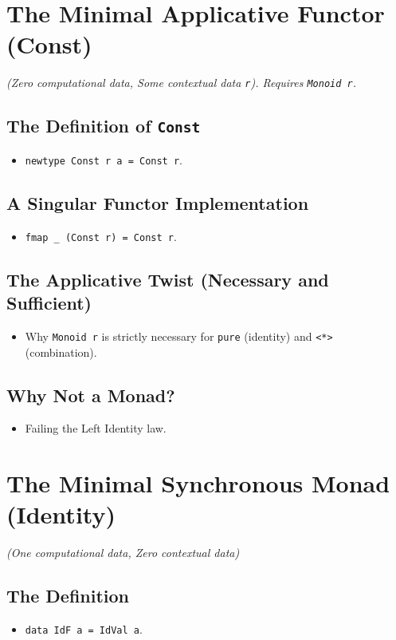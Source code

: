 \documentclass[12pt,a4paper]{article}
\begin{document}
\section{The Minimal Applicative Functor (Const)}
\textit{(Zero computational data, Some contextual data \texttt{r}). Requires \texttt{Monoid r}.}

\subsection{The Definition of \texttt{Const}}
\begin{itemize}
    \item \texttt{newtype Const r a = Const r}.
\end{itemize}

\subsection{A Singular Functor Implementation}
\begin{itemize}
    \item \texttt{fmap \_ (Const r) = Const r}.
\end{itemize}

\subsection{The Applicative Twist (Necessary and Sufficient)}
\begin{itemize}
    \item Why \texttt{Monoid r} is strictly necessary for \texttt{pure} (identity) and \texttt{<*>} (combination).
\end{itemize}

\subsection{Why Not a Monad?}
\begin{itemize}
    \item Failing the Left Identity law.
\end{itemize}

\section{The Minimal Synchronous Monad (Identity)}
\textit{(One computational data, Zero contextual data)}

\subsection{The Definition}
\begin{itemize}
    \item \texttt{data IdF a = IdVal a}.
\end{itemize}
\end{document}
